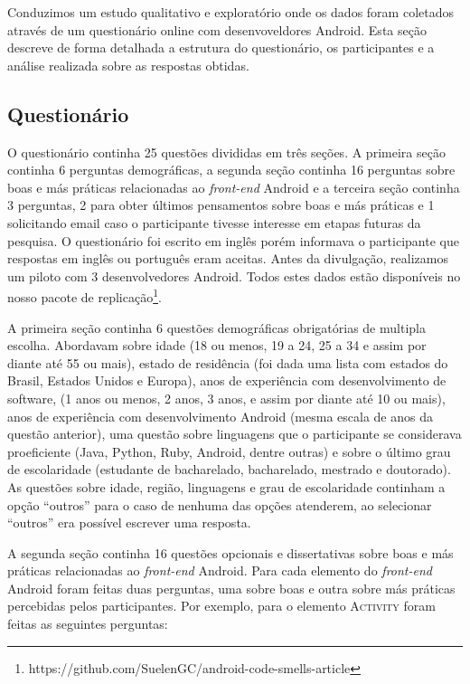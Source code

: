 Conduzimos um estudo qualitativo e explorat\'orio onde os dados foram coletados atrav\'es de um question\'ario online com desenvoveldores Android. Esta se\c{c}\~ao descreve de forma detalhada a estrutura do question\'ario, os participantes e a an\'alise realizada sobre as respostas obtidas.

\subsection{Question\'ario}
\label{sub:questionario}

O question\'ario continha 25 quest\~oes divididas em tr\^es se\c{c}\~oes. A primeira se\c{c}\~ao continha 6 perguntas demogr\'aficas, a segunda se\c{c}\~ao continha 16 perguntas sobre boas e m\'as pr\'aticas relacionadas ao \textit{front-end} Android e a terceira se\c{c}\~ao continha 3 perguntas, 2 para obter \'ultimos pensamentos sobre boas e m\'as pr\'aticas e 1 solicitando email caso o participante tivesse interesse em etapas futuras da pesquisa. O question\'ario foi escrito em ingl\^es por\'em informava o participante que respostas em ingl\^es ou portugu\^es eram aceitas. Antes da divulga\c{c}\~ao, realizamos um piloto com 3 desenvolvedores Android. Todos estes dados est\~ao dispon\'iveis no nosso pacote de replica\c{c}\~ao\footnote{https://github.com/SuelenGC/android-code-smells-article}.

A primeira se\c{c}\~ao continha 6 quest\~oes demogr\'aficas obrigat\'orias de multipla escolha. Abordavam sobre idade (18 ou menos, 19 a 24, 25 a 34 e assim por diante at\'e 55 ou mais), estado de resid\^encia (foi dada uma lista com estados do Brasil, Estados Unidos e Europa), anos de experi\^encia com desenvolvimento de software, (1 anos ou menos, 2 anos, 3 anos, e assim por diante at\'e 10 ou mais), anos de experi\^encia com desenvolvimento Android (mesma escala de anos da quest\~ao anterior), uma quest\~ao sobre linguagens que o participante se considerava proeficiente (Java, Python, Ruby, Android, dentre outras) e sobre o \'ultimo grau de escolaridade (estudante de bacharelado, bacharelado, mestrado e doutorado). As quest\~oes sobre idade, regi\~ao, linguagens e grau de escolaridade continham a op\c{c}\~ao ``outros'' para o caso de nenhuma das op\c{c}\~oes atenderem, ao selecionar ``outros'' era poss\'ivel escrever uma resposta.

A segunda se\c{c}\~ao continha 16 quest\~oes opcionais e dissertativas sobre boas e m\'as pr\'aticas relacionadas ao \textit{front-end} Android. Para cada elemento do \textit{front-end} Android foram feitas duas perguntas, uma sobre boas e outra sobre m\'as pr\'aticas percebidas pelos participantes. Por exemplo, para o elemento \textsc{Activity} foram feitas as seguintes perguntas:

